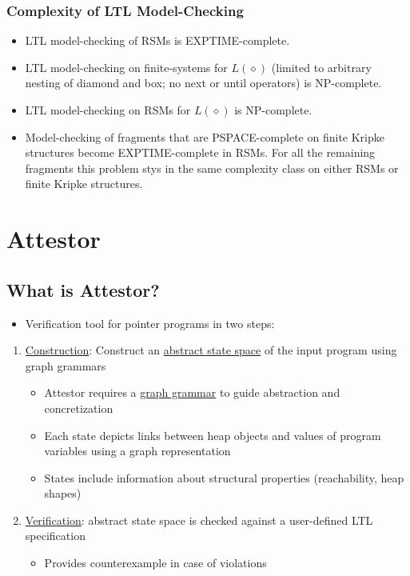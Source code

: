 \documentclass[a4paper,12pt]{article}
\begin{document}
\subsubsection{Complexity of LTL Model-Checking}
\begin{itemize}
	\item LTL model-checking of RSMs is EXPTIME-complete.
	\item LTL model-checking on finite-systems for $L(\diamond)$ (limited to arbitrary nesting of diamond and box; no next or until operators) is NP-complete.
	\item LTL model-checking on RSMs for $L(\diamond)$ is NP-complete.
	\item Model-checking of fragments that are PSPACE-complete on finite Kripke structures become EXPTIME-complete in RSMs. For all the remaining fragments this problem stys in the same complexity class on either RSMs or finite Kripke structures.
\end{itemize}

\section{Attestor}

\subsection{What is Attestor?}

\begin{itemize}
	\item Verification tool for pointer programs in two steps:
\end{itemize}

\begin{enumerate}
	\item \ul{Construction}: Construct an \ul{abstract state space} of the input program using graph grammars
	\begin{itemize}
		\item Attestor requires a \ul{graph grammar} to guide abstraction and concretization
		\item Each state depicts links between heap objects and values of program variables using a graph representation
		\item States include information about structural properties (reachability, heap shapes)
	\end{itemize}
	\item \ul{Verification}: abstract state space is checked against a user-defined LTL specification
	\begin{itemize}
		\item Provides counterexample in case of violations
	\end{itemize}
\end{enumerate}
\end{document}
